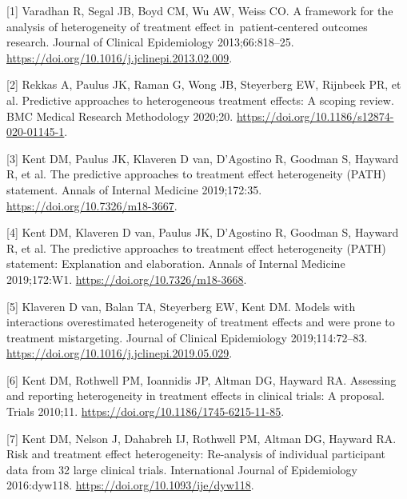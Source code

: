 \documentclass[]{elsarticle} %
\newenvironment{cslreferences}%
  {}%
  {\par}
\begin{document}
\setlength{\parindent}{-0.25in}
\setlength{\leftskip}{0.25in}

\noindent

\hypertarget{refs}{}
\begin{cslreferences}
\leavevmode\hypertarget{ref-Varadhan2013}{}%
{[}1{]} Varadhan R, Segal JB, Boyd CM, Wu AW, Weiss CO. A framework for
the analysis of heterogeneity of treatment effect in~patient-centered
outcomes research. Journal of Clinical Epidemiology 2013;66:818--25.
\url{https://doi.org/10.1016/j.jclinepi.2013.02.009}.

\leavevmode\hypertarget{ref-Rekkas2020}{}%
{[}2{]} Rekkas A, Paulus JK, Raman G, Wong JB, Steyerberg EW, Rijnbeek
PR, et al. Predictive approaches to heterogeneous treatment effects: A
scoping review. BMC Medical Research Methodology 2020;20.
\url{https://doi.org/10.1186/s12874-020-01145-1}.

\leavevmode\hypertarget{ref-Kent2019}{}%
{[}3{]} Kent DM, Paulus JK, Klaveren D van, D'Agostino R, Goodman S,
Hayward R, et al. The predictive approaches to treatment effect
heterogeneity (PATH) statement. Annals of Internal Medicine 2019;172:35.
\url{https://doi.org/10.7326/m18-3667}.

\leavevmode\hypertarget{ref-PathEnE}{}%
{[}4{]} Kent DM, Klaveren D van, Paulus JK, D'Agostino R, Goodman S,
Hayward R, et al. The predictive approaches to treatment effect
heterogeneity (PATH) statement: Explanation and elaboration. Annals of
Internal Medicine 2019;172:W1. \url{https://doi.org/10.7326/m18-3668}.

\leavevmode\hypertarget{ref-vanKlaveren2019}{}%
{[}5{]} Klaveren D van, Balan TA, Steyerberg EW, Kent DM. Models with
interactions overestimated heterogeneity of treatment effects and were
prone to treatment mistargeting. Journal of Clinical Epidemiology
2019;114:72--83. \url{https://doi.org/10.1016/j.jclinepi.2019.05.029}.

\leavevmode\hypertarget{ref-Kent2010}{}%
{[}6{]} Kent DM, Rothwell PM, Ioannidis JP, Altman DG, Hayward RA.
Assessing and reporting heterogeneity in treatment effects in clinical
trials: A proposal. Trials 2010;11.
\url{https://doi.org/10.1186/1745-6215-11-85}.

\leavevmode\hypertarget{ref-Kent2016}{}%
{[}7{]} Kent DM, Nelson J, Dahabreh IJ, Rothwell PM, Altman DG, Hayward
RA. Risk and treatment effect heterogeneity: Re-analysis of individual
participant data from 32 large clinical trials. International Journal of
Epidemiology 2016:dyw118. \url{https://doi.org/10.1093/ije/dyw118}.


\end{cslreferences}
\end{document}
